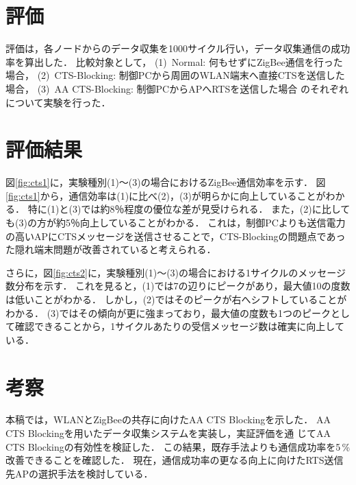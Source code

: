 \documentclass[12pt]{jreport}
\begin{document}
\section{評価}

評価は，各ノードからのデータ収集を1000サイクル行い，データ収集通信の成功
率を算出した．
比較対象として，
(1)~Normal: 何もせずにZigBee通信を行った場合，
(2)~CTS-Blocking: 制御PCから周囲のWLAN端末へ直接CTSを送信した場合，
(3)~AA CTS-Blocking: 制御PCからAPへRTSを送信した場合
のそれぞれについて実験を行った．


\section{評価結果}\label{sec:exp_result}

図\ref{fig:cts1}に，実験種別(1)～(3)の場合におけるZigBee通信効率を示す．
図\ref{fig:cts1}から，通信効率は(1)に比べ(2)，(3)が明らかに向上していることがわかる．
特に(1)と(3)では約8％程度の優位な差が見受けられる．
また，(2)に比しても(3)の方が約5％向上していることがわかる．
これは，制御PCよりも送信電力の高いAPにCTSメッセージを送信させることで，CTS-Blockingの問題点であった隠れ端末問題が改善されていると考えられる．

さらに，図\ref{fig:cts2}に，実験種別(1)～(3)の場合における1サイクルのメッセージ数分布を示す．
これを見ると，(1)では7の辺りにピークがあり，最大値10の度数は低いことがわかる．
しかし，(2)ではそのピークが右へシフトしていることがわかる．
(3)ではその傾向が更に強まっており，最大値の度数も1つのピークとして確認できることから，1サイクルあたりの受信メッセージ数は確実に向上している．

\section{考察}\label{sec:conclu}

本稿では，WLANとZigBeeの共存に向けたAA CTS Blockingを示した．
AA CTS Blockingを用いたデータ収集システムを実装し，実証評価を通
じてAA CTS Blockingの有効性を検証した．
この結果，既存手法よりも通信成功率を5\,\%改善できることを確認した．
現在，通信成功率の更なる向上に向けたRTS送信先APの選択手法を検討している．
\end{document}
